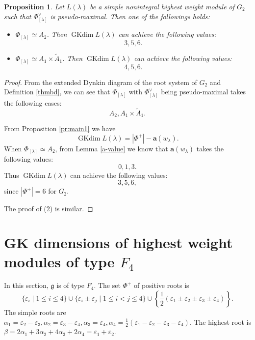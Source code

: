 \documentclass[reqno,12pt]{amsart}
\numberwithin{equation}{section}
\theoremstyle{plain}
\newtheorem{Prop}[Thm]{Proposition}
\theoremstyle{definition}
\newcommand{\lam}{\lambda}
\newcommand{\ep}{\varepsilon}
\newcommand{\mf}[1]{\mathfrak{#1}}
\newcommand{\aff}{ \mathbf{a} }
\newcommand{\gkd}{\operatorname{GKdim}}
\newcommand{\lest}{\leqslant}
\begin{document}
\begin{Prop}\label{g2-nonint}
Let $L(\lam)$ be a simple nonintegral highest weight module of $G_2$  such that $\Phi_{[\lam]}^\vee$ is pseudo-maximal. Then one of the followings holds:
\begin{itemize}
    \item[(1)] $\Phi_{[\lam]}\simeq A_2$. Then
$ \gkd L(\lam) $ can achieve the following values:
$$3,5,6.$$

\item[(2)] $\Phi_{[\lam]}\simeq A_1\times \tilde{A}_1$. Then
$ \gkd L(\lam) $ can achieve the following values:
$$4,5,6.$$
     
   
 
  \end{itemize}

\end{Prop}


\begin{proof}
    
 From the extended Dynkin diagram of the root system of $G_2$ and Definition \ref{thmbd}, we can see that $\Phi_{[\lam]}$ with $\Phi_{[\lam]}^\vee$ being pseudo-maximal takes the following cases:
$$ A_2, A_1\times \tilde{A}_1.$$
    
    From Proposition \ref{pr:main1} we have \begin{equation*}
	\gkd L(\lambda)=|\Phi^+|-\aff(w_{\lambda}).
\end{equation*}
When $\Phi_{[\lam]}\simeq A_2$, from Lemma \ref{a-value} we know that $\aff(w_{\lambda})$ takes the following values: $$0,1,3.$$ 
Thus $ \gkd L(\lam) $ can achieve the following values:
$$3,5,6,$$
since $|\Phi^+|=6$ for $G_2$.

The proof of (2) is similar.
\end{proof}


\section{GK dimensions of  highest weight modules of type \texorpdfstring{$F_4$}{}}\label{f4-gkd}

%
%


 In this section, $ \mf{g}$ is of type $ F_4 $.
The set $ \Phi^+ $ of positive roots is
\[
\{\ep_i\mid 1\lest i \lest 4\}\cup \{  \ep_i\pm \ep_j\mid 1\lest i<j \lest 4\} \cup\left \{ \frac12(\ep_1\pm \ep_2\pm\ep_3\pm \ep_4) \right\}.
\]
The  simple roots are $ \alpha_1=\ep_2-\ep_3,\alpha_2=\ep_3-\ep_4,\alpha_3=\ep_4, \alpha_4=\frac12(\ep_1- \ep_2-\ep_3- \ep_4)$.  The highest root is $\beta=2\alpha_1+3\alpha_2+4\alpha_3+2\alpha_4=\ep_1+\ep_2.$
\end{document}
